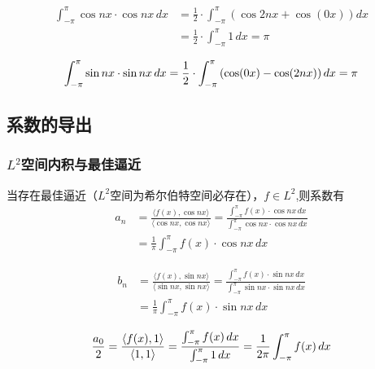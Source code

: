 \documentclass[12pt,a4paper]{article}
\numberwithin{subsection}{section}   %
\numberwithin{subsubsection}{subsection}
\theoremstyle{plain}
\theoremstyle{definition}
\theoremstyle{remark}
\theoremstyle{remark}
\begin{document}
\begin{equation}
	\begin{aligned}
		\int_{-\pi}^{\pi} \cos nx \cdot \cos nx \, dx &= \frac{1}{2} \cdot \int_{-\pi}^{\pi} \left( \cos 2nx + \cos(0x) \right) dx \\[8pt]
		&= \frac{1}{2} \cdot \int_{-\pi}^{\pi} 1 \, dx = \pi
	\end{aligned}
\end{equation}

\begin{equation}
		\int_{-\pi}^{\pi} \sin nx \cdot \sin nx \, dx = \frac{1}{2} \cdot \int_{-\pi}^{\pi} \left( \cos(0x) - \cos(2nx) \right) dx \\[8pt]
		= \pi
\end{equation}

\subsection{系数的导出}

	\subsubsection{$L^2$空间内积与最佳逼近}
当存在最佳逼近（$L^2$空间为希尔伯特空间必存在），$f \in L^2$,则系数有
\begin{equation}
	\begin{aligned}
		a_n &= \frac{\langle f(x), \cos nx \rangle}{\langle \cos nx, \cos nx \rangle} = \frac{\int_{-\pi}^{\pi} f(x) \cdot \cos nx \, dx}{\int_{-\pi}^{\pi} \cos nx \cdot \cos nx \, dx} \\[8pt]
		&= \frac{1}{\pi} \int_{-\pi}^{\pi} f(x) \cdot \cos nx \, dx
	\end{aligned}
\end{equation}


\begin{equation}
	\begin{aligned}
		b_n &= \frac{\langle f(x), \sin nx \rangle}{\langle \sin nx, \sin nx \rangle} = \frac{\int_{-\pi}^{\pi} f(x) \cdot \sin nx \, dx}{\int_{-\pi}^{\pi} \sin nx \cdot \sin nx \, dx} \\[8pt]
		&= \frac{1}{\pi} \int_{-\pi}^{\pi} f(x) \cdot \sin nx \, dx
	\end{aligned}
\end{equation}

\begin{equation}
 \frac{a_0}{2} = \frac{\langle f(x), 1 \rangle}{\langle 1, 1 \rangle} = \frac{\int_{-\pi}^{\pi} f(x) \, dx}{\int_{-\pi}^{\pi} 1  \, dx} \\[8pt]
= \frac{1}{2\pi} \int_{-\pi}^{\pi} f(x)  \, dx
\end{equation}
\end{document}
